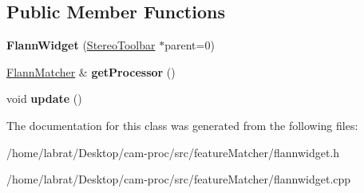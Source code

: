 \subsection*{Public Member Functions}
\begin{DoxyCompactItemize}
\item 
{\bfseries Flann\+Widget} (\hyperlink{classStereoToolbar}{Stereo\+Toolbar} $\ast$parent=0)\hypertarget{classFlannWidget_ac76c1cd3d8ad93c983845722064ff428}{}\label{classFlannWidget_ac76c1cd3d8ad93c983845722064ff428}

\item 
\hyperlink{classFlannMatcher}{Flann\+Matcher} \& {\bfseries get\+Processor} ()\hypertarget{classFlannWidget_ae4043b465aed916fa0464e179fa41843}{}\label{classFlannWidget_ae4043b465aed916fa0464e179fa41843}

\item 
void {\bfseries update} ()\hypertarget{classFlannWidget_a6e48067006112ce8b317552833a6cbd5}{}\label{classFlannWidget_a6e48067006112ce8b317552833a6cbd5}

\end{DoxyCompactItemize}


The documentation for this class was generated from the following files\+:\begin{DoxyCompactItemize}
\item 
/home/labrat/\+Desktop/cam-\/proc/src/feature\+Matcher/flannwidget.\+h\item 
/home/labrat/\+Desktop/cam-\/proc/src/feature\+Matcher/flannwidget.\+cpp\end{DoxyCompactItemize}
